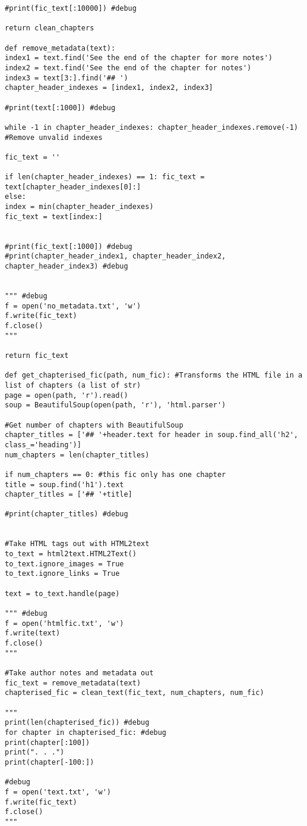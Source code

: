 \documentclass{pre-tfg}
\begin{document}
\begin{lstlisting}[style=consola]
#print(fic_text[:10000]) #debug

return clean_chapters

def remove_metadata(text):
index1 = text.find('See the end of the chapter for more notes')
index2 = text.find('See the end of the chapter for notes')
index3 = text[3:].find('## ')
chapter_header_indexes = [index1, index2, index3]

#print(text[:1000]) #debug

while -1 in chapter_header_indexes: chapter_header_indexes.remove(-1) #Remove unvalid indexes

fic_text = ''

if len(chapter_header_indexes) == 1: fic_text = text[chapter_header_indexes[0]:]
else:
index = min(chapter_header_indexes)
fic_text = text[index:]


#print(fic_text[:1000]) #debug
#print(chapter_header_index1, chapter_header_index2, chapter_header_index3) #debug


""" #debug
f = open('no_metadata.txt', 'w')
f.write(fic_text)
f.close()
"""

return fic_text

def get_chapterised_fic(path, num_fic): #Transforms the HTML file in a list of chapters (a list of str)
page = open(path, 'r').read()
soup = BeautifulSoup(open(path, 'r'), 'html.parser')

#Get number of chapters with BeautifulSoup
chapter_titles = ['## '+header.text for header in soup.find_all('h2', class_='heading')]
num_chapters = len(chapter_titles)

if num_chapters == 0: #this fic only has one chapter
title = soup.find('h1').text
chapter_titles = ['## '+title]

#print(chapter_titles) #debug


#Take HTML tags out with HTML2text
to_text = html2text.HTML2Text()
to_text.ignore_images = True
to_text.ignore_links = True

text = to_text.handle(page)

""" #debug
f = open('htmlfic.txt', 'w')
f.write(text)
f.close()
"""

#Take author notes and metadata out
fic_text = remove_metadata(text)
chapterised_fic = clean_text(fic_text, num_chapters, num_fic)

"""
print(len(chapterised_fic)) #debug
for chapter in chapterised_fic: #debug
print(chapter[:100])
print(". . .")
print(chapter[-100:])

#debug
f = open('text.txt', 'w')
f.write(fic_text)
f.close()
"""


\end{lstlisting}
\end{document}
